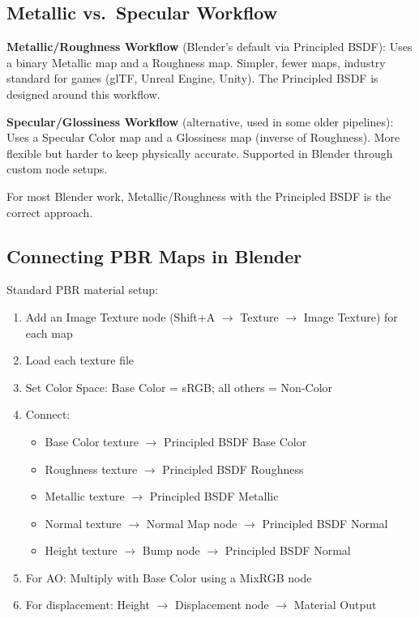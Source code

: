 \subsection{Metallic vs.\ Specular Workflow}

\textbf{Metallic/Roughness Workflow} (Blender's default via
Principled BSDF): Uses a binary Metallic map and a Roughness map.
Simpler, fewer maps, industry standard for games (glTF, Unreal
Engine, Unity). The Principled BSDF is designed around this workflow.

\textbf{Specular/Glossiness Workflow} (alternative, used in some
older pipelines): Uses a Specular Color map and a Glossiness map
(inverse of Roughness). More flexible but harder to keep physically
accurate. Supported in Blender through custom node setups.

For most Blender work, Metallic/Roughness with the Principled BSDF
is the correct approach.

\subsection{Connecting PBR Maps in Blender}

Standard PBR material setup:

\begin{enumerate}[leftmargin=2em]
  \item Add an Image Texture node (Shift+A $\rightarrow$ Texture
        $\rightarrow$ Image Texture) for each map
  \item Load each texture file
  \item Set Color Space: Base Color = sRGB; all others = Non-Color
  \item Connect:
    \begin{itemize}[leftmargin=1.5em]
      \item Base Color texture $\rightarrow$ Principled BSDF Base Color
      \item Roughness texture $\rightarrow$ Principled BSDF Roughness
      \item Metallic texture $\rightarrow$ Principled BSDF Metallic
      \item Normal texture $\rightarrow$ Normal Map node $\rightarrow$ Principled BSDF Normal
      \item Height texture $\rightarrow$ Bump node $\rightarrow$ Principled BSDF Normal
    \end{itemize}
  \item For AO: Multiply with Base Color using a MixRGB node
  \item For displacement: Height $\rightarrow$ Displacement node
        $\rightarrow$ Material Output
\end{enumerate}

